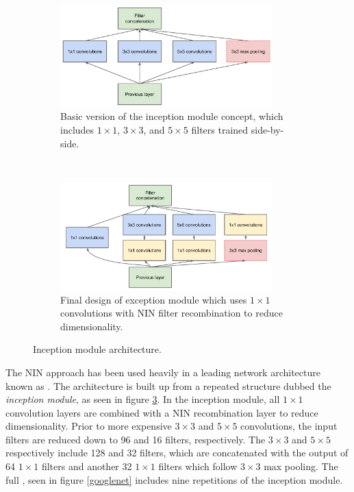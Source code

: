 \begin{figure}[t]
\begin{subfigure}[t]{0.5\textwidth}
                \centering
                \includegraphics[width=0.9\textwidth]{figures/figures/inceptionnaive.pdf}
               \caption{Basic version of the inception module concept, which includes $1\times1$, $3\times3$, and $5\times5$ filters trained side-by-side.}
                 \label{basicinception}
        \end{subfigure}
        ~
\begin{subfigure}[t]{0.5\textwidth}
                \centering
                \includegraphics[width=0.9\textwidth]{figures/figures/inceptionmodule.pdf}
               \caption{Final design of exception module which uses $1\times1$ convolutions with NIN filter recombination to reduce dimensionality.}
                \label{fullinception}

        \end{subfigure}
        \caption{Inception module architecture.}
        \label{inception}
\end{figure}


The NIN approach has been used heavily in a leading network architecture known as \googlenet \cite{szegedy2014going}.
The \googlenet architecture is built up from a repeated structure dubbed the \textit{inception module}, as seen in figure \ref{inception}.
In the inception module, all $1\times1$ convolution layers are combined with a NIN recombination layer to reduce dimensionality.
Prior to more expensive $3\times3$ and $5\times5$ convolutions, the input filters are reduced down to 96 and 16 filters, respectively.
The $3\times3$ and $5\times5$ respectively include 128 and 32 filters, which are concatenated with the output of 64 $1\times1$ filters and another 32 $1\times1$ filters which follow $3\times3$ max pooling.  The full \googlenet, seen in figure \ref{googlenet} includes nine repetitions of the inception module.

